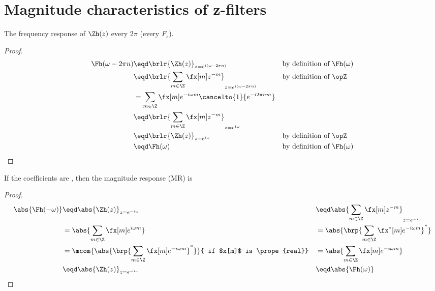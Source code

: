 
\chapter{Magnitude characteristics of z-filters}

\begin{remark}
The frequency response of $\Zh(z)$  every $2\pi$ (every $F_s$).
\end{remark}
\begin{proof}
\begin{align*}
  \Fh(\omega-2\pi n)
    &\eqd \brlr{\Zh(z)}_{z=e^{i(\omega-2\pi n)}}
    && \text{by definition of $\Fh(\omega)$}
  \\&\eqd \brlr{\sum_{m\in\Z} \fx[m] z^{-m}}_{z=e^{i(\omega-2\pi n)}}
    &&\text{by definition of $\opZ$}
  \\&= \sum_{m\in\Z} \fx[m] e^{-i\omega m}\cancelto{1}{e^{-i2\pi nm}}
  \\&\eqd \brlr{\sum_{m\in\Z} \fx[m] z^{-m}}_{z=e^{i\omega}}
  \\&\eqd \brlr{\Zh(z)}_{z=e^{i\omega}}
    &&\text{by definition of $\opZ$}
  \\&\eqd \Fh(\omega)
    && \text{by definition of $\Fh(\omega)$}
\end{align*}
\end{proof}

\begin{remark}
If the coefficients are , then the magnitude response (MR) is 
\end{remark}
\begin{proof}
\begin{align*}
  \abs{\Fh(-\omega)}
    &\eqd \abs{\Zh(z)}_{z=e^{-i\omega}}
   &&\eqd \abs{\sum_{m\in\Z} \fx[m] z^{-m}}_{z=e^{-i\omega}}
  \\&= \abs{\sum_{m\in\Z} \fx[m] e^{i\omega m}}
   &&= \abs{\brp{\sum_{m\in\Z} \fx^\ast[m] e^{-i\omega m}}^\ast}
  \\&= \mcom{\abs{\brp{\sum_{m\in\Z} \fx[m] e^{-i\omega m}}^\ast}}
            { if $x[m]$ is \prope{real}}
   &&= \abs{\sum_{m\in\Z} \fx[m] e^{-i\omega m}}
  \\&\eqd \abs{\Zh(z)}_{z=e^{-i\omega}}
   &&\eqd \abs{\Fh(\omega)}
\end{align*}
\end{proof}

